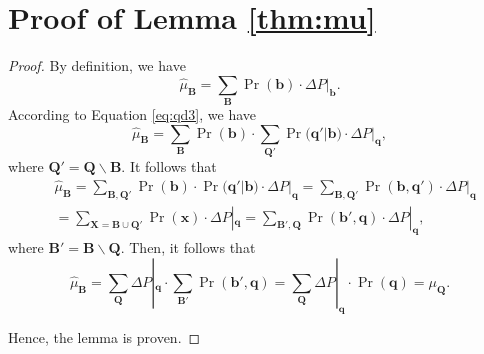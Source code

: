 \documentclass[twoside,leqno,twocolumn]{article}
\begin{document}
\section{Proof of Lemma \ref{thm:mu}}\label{sec:thm:mu}
\begin{proof}
By definition, we have
\begin{equation*}
\hat{\mu}_{\mathbf{B}}=\sum_{\mathbf{B}}\Pr(\mathbf{b})\cdot \Delta P|_{\mathbf{b}}.
\end{equation*}
According to Equation \eqref{eq:qd3}, we have
\begin{equation*}
\hat{\mu}_{\mathbf{B}}=\sum_{\mathbf{B}}\Pr(\mathbf{b})\cdot \sum_{\mathbf{Q'}}\Pr(\mathbf{q'}|\mathbf{b})\cdot \Delta P|_{\mathbf{q}},
\end{equation*}
where $\mathbf{Q'}=\mathbf{Q}\backslash \mathbf{B}$. It follows that
\begin{equation*}
\begin{split}
& \hat{\mu}_{\mathbf{B}}=\sum_{\mathbf{B},\mathbf{Q'}}\Pr(\mathbf{b})\cdot \Pr(\mathbf{q'}|\mathbf{b})\cdot \Delta P|_{\mathbf{q}} = \sum_{\mathbf{B},\mathbf{Q'}}\Pr(\mathbf{b},\mathbf{q'})\cdot \Delta P|_{\mathbf{q}} \\
& = \sum_{\mathbf{X}=\mathbf{B\cup Q'}}\Pr(\mathbf{x})\cdot \Delta P|_{\mathbf{q}} = \sum_{\mathbf{B'},\mathbf{Q}}\Pr(\mathbf{b'},\mathbf{q})\cdot \Delta P|_{\mathbf{q}},
\end{split}
\end{equation*}
where $\mathbf{B'}=\mathbf{B}\backslash \mathbf{Q}$. Then, it follows that
\begin{equation*}
\hat{\mu}_{\mathbf{B}}=\sum_{\mathbf{Q}}\Delta P|_{\mathbf{q}}\cdot \sum_{\mathbf{B'}}\Pr(\mathbf{b'},\mathbf{q}) = \sum_{\mathbf{Q}}\Delta P|_{\mathbf{q}}\cdot \Pr(\mathbf{q}) = \mu_{\mathbf{Q}}.
\end{equation*}

Hence, the lemma is proven.
\end{proof}
\end{document}
